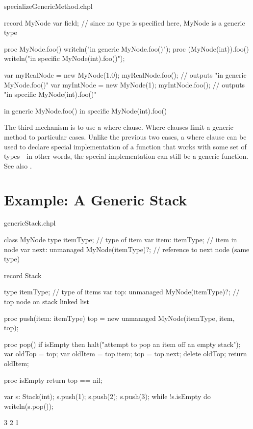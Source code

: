 \begin{chapelexample}{specializeGenericMethod.chpl}
\begin{chapel}

record MyNode {
  var field;  // since no type is specified here, MyNode is a generic type
}

proc MyNode.foo() {
  writeln("in generic MyNode.foo()");
}
proc (MyNode(int)).foo() {
  writeln("in specific MyNode(int).foo()");
}

var myRealNode = new MyNode(1.0);
myRealNode.foo(); // outputs "in generic MyNode.foo()"
var myIntNode = new MyNode(1);
myIntNode.foo(); // outputs "in specific MyNode(int).foo()"
\end{chapel}
\begin{chapeloutput}
in generic MyNode.foo()
in specific MyNode(int).foo()
\end{chapeloutput}
\end{chapelexample}

The third mechanism is to use a where clause. Where clauses limit a
generic method to particular cases. Unlike the previous two cases, a
where clause can be used to declare special implementation of a function
that works with some set of types - in other words, the special
implementation can still be a generic function.  See also
.

\section{Example: A Generic Stack}
\label{Example_Generic_Stack}
\begin{chapelexample}{genericStack.chpl}
\begin{chapel}
class MyNode {
  type itemType;              // type of item
  var item: itemType;         // item in node
  var next: unmanaged MyNode(itemType)?; // reference to next node (same type)
}

record Stack {
  type itemType;             // type of items
  var top: unmanaged MyNode(itemType)?; // top node on stack linked list

  proc push(item: itemType) {
    top = new unmanaged MyNode(itemType, item, top);
  }

  proc pop() {
    if isEmpty then
      halt("attempt to pop an item off an empty stack");
    var oldTop = top;
    var oldItem = top.item;
    top = top.next;
    delete oldTop;
    return oldItem;
  }

  proc isEmpty return top == nil;
}
\end{chapel}
\begin{chapelpost}
var s: Stack(int);
s.push(1);
s.push(2);
s.push(3);
while !s.isEmpty do
  writeln(s.pop());
\end{chapelpost}
\begin{chapeloutput}
3
2
1
\end{chapeloutput}
\end{chapelexample}
